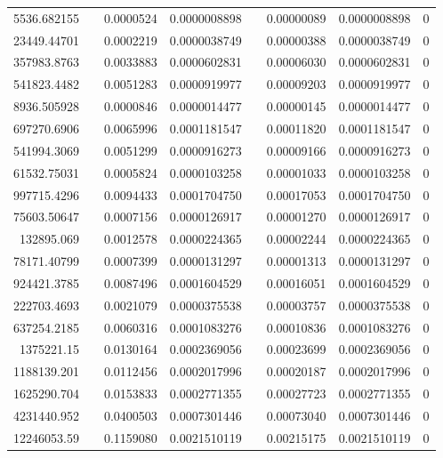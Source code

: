 \documentclass[
journal=jacsat, %
manuscript=article]{achemso}
\begin{document}
\begin{table}[htbp]
{\begin{tabular}{rrrrrrrr}
    5536.682155 &       & 0.0000524 & 0.0000008898 &       & 0.00000089 & 0.0000008898 & 0 \\
    23449.44701 &       & 0.0002219 & 0.0000038749 &       & 0.00000388 & 0.0000038749 & 0 \\
    357983.8763 &       & 0.0033883 & 0.0000602831 &       & 0.00006030 & 0.0000602831 & 0 \\
    541823.4482 &       & 0.0051283 & 0.0000919977 &       & 0.00009203 & 0.0000919977 & 0 \\
    8936.505928 &       & 0.0000846 & 0.0000014477 &       & 0.00000145 & 0.0000014477 & 0 \\
    697270.6906 &       & 0.0065996 & 0.0001181547 &       & 0.00011820 & 0.0001181547 & 0 \\
    541994.3069 &       & 0.0051299 & 0.0000916273 &       & 0.00009166 & 0.0000916273 & 0 \\
    61532.75031 &       & 0.0005824 & 0.0000103258 &       & 0.00001033 & 0.0000103258 & 0 \\
    997715.4296 &       & 0.0094433 & 0.0001704750 &       & 0.00017053 & 0.0001704750 & 0 \\
    75603.50647 &       & 0.0007156 & 0.0000126917 &       & 0.00001270 & 0.0000126917 & 0 \\
    132895.069 &       & 0.0012578 & 0.0000224365 &       & 0.00002244 & 0.0000224365 & 0 \\
    78171.40799 &       & 0.0007399 & 0.0000131297 &       & 0.00001313 & 0.0000131297 & 0 \\
    924421.3785 &       & 0.0087496 & 0.0001604529 &       & 0.00016051 & 0.0001604529 & 0 \\
    222703.4693 &       & 0.0021079 & 0.0000375538 &       & 0.00003757 & 0.0000375538 & 0 \\
    637254.2185 &       & 0.0060316 & 0.0001083276 &       & 0.00010836 & 0.0001083276 & 0 \\
    1375221.15 &       & 0.0130164 & 0.0002369056 &       & 0.00023699 & 0.0002369056 & 0 \\
    1188139.201 &       & 0.0112456 & 0.0002017996 &       & 0.00020187 & 0.0002017996 & 0 \\
    1625290.704 &       & 0.0153833 & 0.0002771355 &       & 0.00027723 & 0.0002771355 & 0 \\
    4231440.952 &       & 0.0400503 & 0.0007301446 &       & 0.00073040 & 0.0007301446 & 0 \\
    12246053.59 &       & 0.1159080 & 0.0021510119 &       & 0.00215175 & 0.0021510119 & 0 \\

\end{tabular}}
\end{table}
\end{document}
